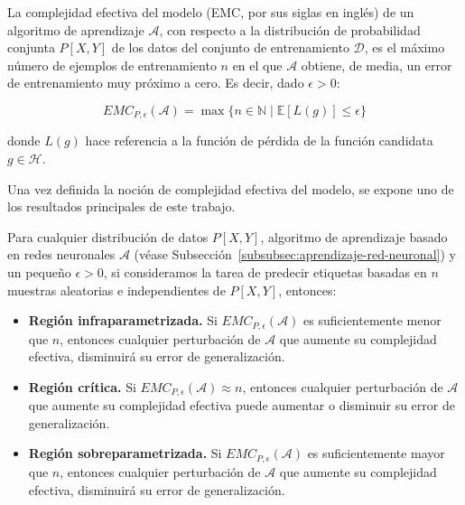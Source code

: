 \begin{definicion}
    La complejidad efectiva del modelo (EMC, por sus siglas en inglés) de un algoritmo de aprendizaje $\mathcal{A}$, con respecto a la distribución de probabilidad conjunta $P[X, Y]$ de los datos del conjunto de entrenamiento $\mathcal{D}$, es el máximo número de ejemplos de entrenamiento $n$ en el que $\mathcal{A}$ obtiene, de media, un error de entrenamiento muy próximo a cero. Es decir, dado $\epsilon > 0$:

    \[
        EMC_{P, \epsilon}(\mathcal{A}) = \max\{ n \in \mathbb{N} \; | \; \mathbb{E}[L(g)] \leq \epsilon \}
    \]  

    donde $L(g)$ hace referencia a la función de pérdida de la función candidata $g \in \mathcal{H}$.\newline
\end{definicion}

Una vez definida la noción de complejidad efectiva del modelo, se expone uno de los resultados principales de este trabajo.

\begin{hipotesis}\label{hipotesis-general-double-descent}
    Para cualquier distribución de datos $P[X, Y]$, algoritmo de aprendizaje basado en redes neuronales $\mathcal{A}$ (véase Subsección~\ref{subsubsec:aprendizaje-red-neuronal}) y un pequeño $\epsilon > 0$, si consideramos la tarea de predecir etiquetas basadas en $n$ muestras aleatorias e independientes de $P[X, Y]$, entonces:

    \begin{itemize}
        \item \textbf{Región infraparametrizada.} Si $EMC_{P, \epsilon}(\mathcal{A})$ es suficientemente menor que $n$, entonces cualquier perturbación de $\mathcal{A}$ que aumente su complejidad efectiva, disminuirá su error de generalización.
        \item \textbf{Región crítica.} Si $EMC_{P, \epsilon}(\mathcal{A}) \approx n$, entonces cualquier perturbación de $\mathcal{A}$ que aumente su complejidad efectiva puede aumentar o disminuir su error de generalización.
        \item \textbf{Región sobreparametrizada.} Si $EMC_{P, \epsilon}(\mathcal{A})$ es suficientemente mayor que $n$, entonces cualquier perturbación de $\mathcal{A}$ que aumente su complejidad efectiva, disminuirá su error de generalización.\newline
    \end{itemize}
\end{hipotesis}

